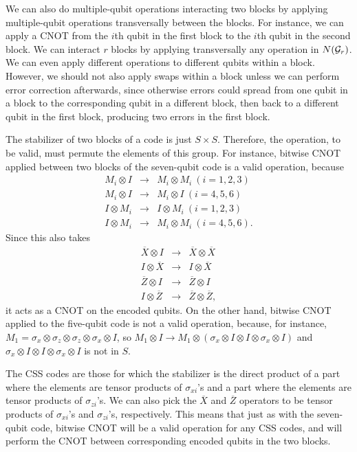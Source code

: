 \documentclass{report}
\newcommand{\G}{{\cal G}}
\newcommand{\X}{\sigma_x}
\newcommand{\Z}{\sigma_z}
\newcommand{\Xs}[1]{\sigma_{x{#1}}}
\newcommand{\Zs}[1]{\sigma_{z{#1}}}
\newcommand{\Xbar}{\overline{X}}
\newcommand{\Zbar}{\overline{Z}}
\begin{document}
We can also do multiple-qubit operations interacting two blocks by 
applying multiple-qubit operations transversally between the blocks.  For 
instance, we can apply a CNOT from the $i$th qubit in the first block to the 
$i$th qubit in the second block.  We can interact $r$ blocks by applying 
transversally any operation in $N(\G_r)$.  We can even apply different 
operations to different qubits within a block.  However, we should not also 
apply swaps within a block unless we can perform error correction 
afterwards, since otherwise errors could spread from one qubit in a block 
to the corresponding qubit in a different block, then back to a different 
qubit in the first block, producing two errors in the first block.

The stabilizer of two blocks of a code is just $S \times S$.  Therefore, the 
operation, to be valid, must permute the elements of this group.  For 
instance, bitwise CNOT applied between two blocks of the seven-qubit code 
is a valid operation, because
\begin{eqnarray}
M_i \otimes I & \rightarrow & M_i \otimes M_i \ (i = 1, 2, 3) \nonumber \\
M_i \otimes I & \rightarrow & M_i \otimes I \ (i = 4, 5, 6) \\
I \otimes M_i & \rightarrow & I \otimes M_i \ (i = 1, 2, 3) \nonumber \\
I \otimes M_i & \rightarrow & M_i \otimes M_i \ (i = 4, 5, 6). \nonumber
\end{eqnarray}
Since this also takes 
\begin{eqnarray}
\Xbar \otimes I & \rightarrow & \Xbar \otimes \Xbar \nonumber \\
I \otimes \Xbar & \rightarrow & I \otimes \Xbar \\
\Zbar \otimes I & \rightarrow & \Zbar \otimes I \nonumber \\
I \otimes \Zbar & \rightarrow & \Zbar \otimes \Zbar, \nonumber
\end{eqnarray}
it acts as a CNOT on the encoded qubits.  On the other hand, bitwise CNOT 
applied to the five-qubit code is not a valid operation, because, for instance, 
$M_1 = \X \otimes \Z \otimes \Z \otimes \X \otimes I$, so $M_1 \otimes I 
\rightarrow M_1 \otimes (\X \otimes I \otimes I \otimes \X \otimes I)$ 
and $\X \otimes I \otimes I \otimes \X \otimes I$ is not in $S$.

The CSS codes are those for which the stabilizer is the direct product of a 
part where the elements are tensor products of $\Xs{i}$'s and a part where 
the elements are tensor products of $\Zs{i}$'s.  We can also pick the $\Xbar$ 
and $\Zbar$ operators to be tensor products of $\Xs{i}$'s and $\Zs{i}$'s, 
respectively.  This means that just as with the seven-qubit code, bitwise CNOT 
will be a valid operation for any CSS codes, and will perform the CNOT between 
corresponding encoded qubits in the two blocks.
\end{document}
